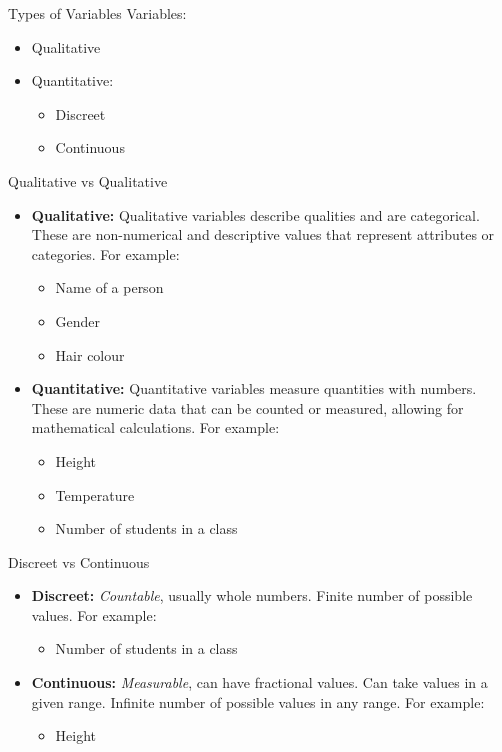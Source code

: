 \documentclass[12pt, aspectratio=169]{beamer}
\begin{document}
	\begin{frame}{Types of Variables}
		Variables:
		\begin{itemize}
			\item Qualitative
			\item Quantitative:
			\begin{itemize}
				\item Discreet
				\item Continuous
			\end{itemize}
		\end{itemize}
	\end{frame}


	\begin{frame}{Qualitative vs Qualitative}
		\begin{itemize}
			\item \textbf{Qualitative:} Qualitative variables describe qualities and are categorical. These are non-numerical and descriptive values that represent attributes or categories. For example:
			\begin{itemize}
				\item Name of a person
				\item Gender
				\item Hair colour
			\end{itemize}
			\item \textbf{Quantitative:} Quantitative variables measure quantities with numbers. These are numeric data that can be counted or measured, allowing for mathematical calculations. For example:
			\begin{itemize}
				\item Height 
				\item Temperature
				\item Number of students in a class 
			\end{itemize}
		\end{itemize}
	\end{frame}


	\begin{frame}{Discreet vs Continuous}
		\begin{itemize}
			\item \textbf{Discreet:} \textit{Countable}, usually whole numbers. Finite number of possible values. For example:
			\begin{itemize}
				\item Number of students in a class
			\end{itemize}
			\item \textbf{Continuous:} \textit{Measurable}, can have fractional values. Can take values in a given range. Infinite number of possible values in any range. For example:
			\begin{itemize}
				\item Height
			\end{itemize}
		\end{itemize}
	\end{frame}
\end{document}
